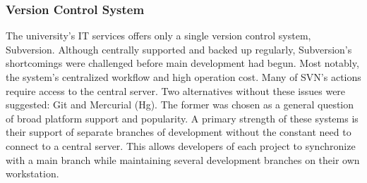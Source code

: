 
\subsubsection{Version Control System}
\label{subsub:git}
\label{subsub:vcs}
The university's IT services offers only a single version control system, Subversion. Although centrally supported and backed up regularly, Subversion's shortcomings were challenged before main development had begun. Most notably, the system's centralized workflow and high operation cost. Many of SVN's actions require access to the central server. Two alternatives without these issues were suggested: Git and Mercurial (Hg). The former was chosen as a general question of broad platform support and popularity. A primary strength of these systems is their support of separate branches of development without the constant need to connect to a central server. This allows developers of each project to synchronize with a main branch while maintaining several development branches on their own workstation.

